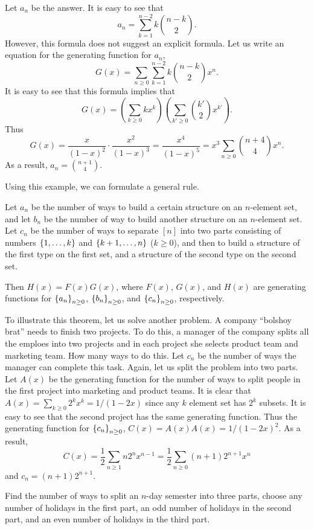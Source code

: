Let $a_n$ be the answer. It is easy to see that
\[
  a_n = \sum_{k = 1}^{n - 2} k \binom{n - k}{2}.
\]
However, this formula does not suggest an explicit formula.
Let us write an equation for the generating function for $a_n$,
\[
  G(x) = \sum_{n \ge 0} \sum_{k = 1}^{n - 2} k \binom{n - k}{2} x^n.
\]
It is easy to see that this formula implies that
\[
  G(x) = \left( \sum_{k \ge 0} k x^k \right)
    \left( \sum_{k' \ge 0} \binom{k'}{2} x^{k'} \right).
\]
Thus
\[
  G(x) = \frac{x}{(1 - x)^2} \cdot \frac{x^2}{(1 - x)^3} =
  \frac{x^4}{(1 - x)^5} = x^3\sum_{n \ge 0} \binom{n + 4}{4} x^n.
\]
As a result, $a_n = \binom{n + 1}{4}$.

Using this example, we can formulate a general rule.
\begin{theorem}
  Let $a_n$ be the number of ways to build a certain structure on an $n$-element
  set, and let $b_n$ be the number of way to build another structure on an
  $n$-element set. Let $c_n$ be the number of ways to separate $[n]$ into two
  parts consisting of numbers $\set{1, \dots, k}$ and $\set{k + 1, \dots, n}$
  ($k \ge 0$), and then to build a structure of the first type on the first set,
  and a structure of the second type on the second set.

  Then $H(x) = F(x)G(x)$, where $F(x)$, $G(x)$, and $H(x)$ are generating
  functions for $\set{a_n}_{n \ge 0}$, $\set{b_n}_{n \ge 0}$, and
  $\set{c_n}_{n \ge 0}$, respectively.
\end{theorem}

To illustrate this theorem, let us solve another problem. A company
``bolshoy brat'' needs to finish two projects. To do this, a manager of the
company splits all the emploes into two projects and in each project she selects
product team and marketing team. How many ways to do this.
Let $c_n$ be the number of ways the manager can complete this task. Again, let
us split the problem into two parts. Let $A(x)$ be the generating function for
the number of ways to split people in the first project into marketing and
product teams. It is clear that $A(x) = \sum_{k \ge 0} 2^k x^k = 1 / (1 - 2x)$
since any $k$ element set has $2^k$ subsets. It is easy to see that the second
project has the same generating function. Thus the generating function for
$\set{c_n}_{n \ge 0}$, $C(x) = A(x) A(x) = 1 / (1 - 2x)^2$.
As a result,
\[
  C(x) = \frac{1}{2} \sum_{n \ge 1} n 2^n x^{n - 1} =
  \frac{1}{2} \sum_{n \ge 0} (n + 1) 2^{n + 1} x^n
\]
and $c_n = (n + 1) 2^{n + 1}$.

\begin{exercise}
  Find the number of ways to split an $n$-day semester into three parts, choose
  any number of holidays in the first part, an odd number of holidays in the
  second part, and an even number of holidays in the third part.
\end{exercise}

